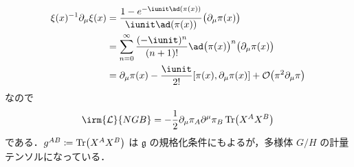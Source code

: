 \documentclass[TQFT_main]{subfiles}
\begin{document}
\begin{align}
    \xi(x)^{-1} \partial_\mu \xi(x) 
    &= \frac{1-e^{-\iunit \ad(\pi(x))}}{\iunit \ad(\pi(x))} \bigl(\partial_\mu \pi(x)\bigr) \\
    &= \sum_{n=0}^\infty \frac{(-\iunit)^{n}}{(n+1)!} \ad\bigl(\pi(x)\bigr)^{n} \bigl(\partial_\mu \pi(x)\bigr) \\
    &= \partial_\mu \pi(x) - \frac{\iunit}{2!} \comm{\pi(x)}{\partial_\mu \pi(x)} + \order{\pi^2 \partial_\mu \pi}
\end{align}
なので
\begin{align}
    \irm{\mathcal{L}}{NGB} = -\frac{1}{2} \partial_\mu \pi_A  \partial^\mu \pi_B \Tr \bigl(X^AX^B \bigr) 
\end{align}
である．$g^{AB} \coloneqq \Tr \bigl(X^AX^B \bigr)$ は $\mathfrak{g}$ の規格化条件にもよるが，多様体 $G/H$ の計量テンソルになっている．
 
\end{document}
